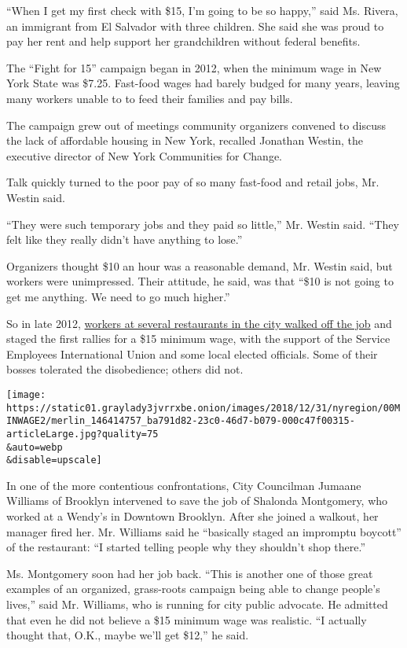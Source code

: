 ``When I get my first check with \$15, I'm going to be so happy,'' said
Ms. Rivera, an immigrant from El Salvador with three children. She said
she was proud to pay her rent and help support her grandchildren without
federal benefits.

The ``Fight for 15'' campaign began in 2012, when the minimum wage in
New York State was \$7.25. Fast-food wages had barely budged for many
years, leaving many workers unable to to feed their families and pay
bills.

The campaign grew out of meetings community organizers convened to
discuss the lack of affordable housing in New York, recalled Jonathan
Westin, the executive director of New York Communities for Change.

Talk quickly turned to the poor pay of so many fast-food and retail
jobs, Mr. Westin said.

``They were such temporary jobs and they paid so little,'' Mr. Westin
said. ``They felt like they really didn't have anything to lose.''

Organizers thought \$10 an hour was a reasonable demand, Mr. Westin
said, but workers were unimpressed. Their attitude, he said, was that
``\$10 is not going to get me anything. We need to go much higher.''

So in late 2012,
\href{https://www.nytimes3xbfgragh.onion/2012/11/30/nyregion/fast-food-workers-in-new-york-city-rally-for-higher-wages.html}{workers
at several restaurants in the city walked off the job} and staged the
first rallies for a \$15 minimum wage, with the support of the Service
Employees International Union and some local elected officials. Some of
their bosses tolerated the disobedience; others did not.

\texttt{[image: https://static01.graylady3jvrrxbe.onion/images/2018/12/31/nyregion/00MINWAGE2/merlin\_146414757\_ba791d82-23c0-46d7-b079-000c47f00315-articleLarge.jpg?quality=75\\\&auto=webp\\\&disable=upscale]}

In one of the more contentious confrontations, City Councilman Jumaane
Williams of Brooklyn intervened to save the job of Shalonda Montgomery,
who worked at a Wendy's in Downtown Brooklyn. After she joined a
walkout, her manager fired her. Mr. Williams said he ``basically staged
an impromptu boycott'' of the restaurant: ``I started telling people why
they shouldn't shop there.''

Ms. Montgomery soon had her job back. ``This is another one of those
great examples of an organized, grass-roots campaign being able to
change people's lives,'' said Mr. Williams, who is running for city
public advocate. He admitted that even he did not believe a \$15 minimum
wage was realistic. ``I actually thought that, O.K., maybe we'll get
\$12,'' he said.

